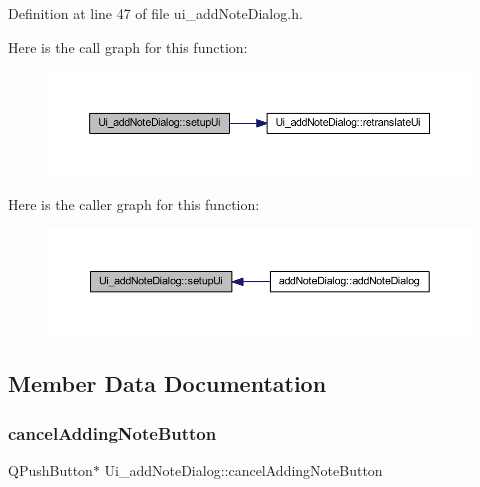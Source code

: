 Definition at line 47 of file ui\+\_\+add\+Note\+Dialog.\+h.

Here is the call graph for this function\+:
\nopagebreak
\begin{figure}[H]
\begin{center}
\leavevmode
\includegraphics[width=350pt]{classUi__addNoteDialog_a2487f1cd1542da959f06b7412e80ef0b_cgraph}
\end{center}
\end{figure}
Here is the caller graph for this function\+:
\nopagebreak
\begin{figure}[H]
\begin{center}
\leavevmode
\includegraphics[width=350pt]{classUi__addNoteDialog_a2487f1cd1542da959f06b7412e80ef0b_icgraph}
\end{center}
\end{figure}


\subsection{Member Data Documentation}
\hypertarget{classUi__addNoteDialog_a600ac0c5310ee52416b8fa3ff1e1142e}{}\label{classUi__addNoteDialog_a600ac0c5310ee52416b8fa3ff1e1142e} 
\subsubsection{\texorpdfstring{cancel\+Adding\+Note\+Button}{cancelAddingNoteButton}}
{\footnotesize\ttfamily Q\+Push\+Button$\ast$ Ui\+\_\+add\+Note\+Dialog\+::cancel\+Adding\+Note\+Button}



